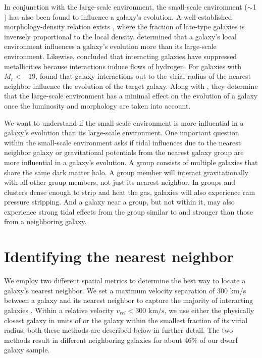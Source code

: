 In conjunction with the large-scale environment, the small-scale environment 
($\sim$1 \hMpc) has also been found to influence a galaxy's evolution.  A 
well-established morphology-density relation exists \citep{Dressler80}, where 
the fraction of late-type galaxies is inversely proportional to the local 
density.  \cite{Ellison09} determined that a galaxy's local environment 
influences a galaxy's evolution more than its large-scale environment.  
Likewise, \cite{Rupke08} concluded that interacting galaxies have suppressed 
metallicities because interactions induce flows of hydrogen.  For galaxies with 
$M_r < -19$, \cite{Park09} found that galaxy interactions out to the virial 
radius of the nearest neighbor influence the evolution of the target galaxy.  
Along with \cite{Park07}, they determine that the large-scale environment has a 
minimal effect on the evolution of a galaxy once the luminosity and morphology 
are taken into account.

We want to understand if the small-scale environment is more influential in a 
galaxy's evolution than its large-scale environment.  One important question 
within the small-scale environment asks if tidal influences due to the nearest 
neighbor galaxy or gravitational potentials from the nearest galaxy group are 
more influential in a galaxy's evolution.  A group consists of multiple galaxies 
that share the same dark matter halo.  A group member will interact 
gravitationally with all other group members, not just its nearest neighbor.  In 
groups and clusters dense enough to strip and heat the gas, galaxies will also 
experience ram pressure stripping.  And a galaxy near a group, but not within 
it, may also experience strong tidal effects from the group similar to and 
stronger than those from a neighboring galaxy.





\section[Nearest neighbor calculations]{Identifying the nearest neighbor}\label{sec:Theory_dist}

We employ two different spatial metrics to determine the best way to locate a 
galaxy's nearest neighbor.  We set a maximum velocity separation of 300 km/s 
between a galaxy and its nearest neighbor to capture the majority of interacting 
galaxies \citep[according to the distribution in peculiar velocity shown in][]
{Hwang10}.  Within a relative velocity $v_{rel} < 300\text{ km/s}$, we use 
either the physically closest galaxy in units of \hMpc or the galaxy within the 
smallest fraction of its virial radius; both these methods are described below 
in further detail.  The two methods result in different neighboring galaxies for 
about 46\% of our dwarf galaxy sample.


